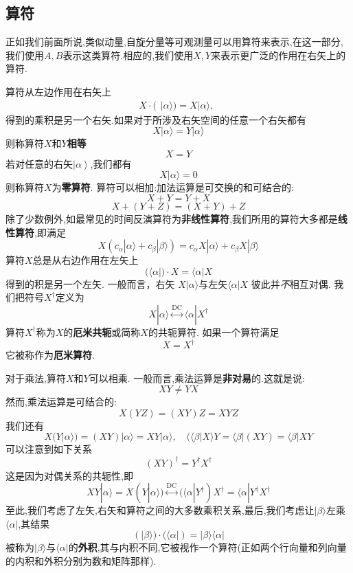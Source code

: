 \documentclass[lang=cn,newtx,10pt,scheme=chinese,thmcnt=section]{elegantbook}
\begin{document}
\subsection*{算符}
正如我们前面所说,类似动量,自旋分量等可观测量可以用算符来表示,在这一部分,我们使用$A,B$表示这类算符.相应的,我们使用$X,Y$来表示更广泛的作用在右矢上的算符.

算符从左边作用在右矢上
$$X\cdot(\begin{array}{c}|\alpha\rangle)=X|\alpha\rangle,\end{array}$$
得到的乘积是另一个右矢.如果对于所涉及右矢空间的任意一个右矢都有
$$X|\alpha\rangle=Y|\alpha\rangle$$
则称算符$X$和$Y$\textbf{相等}
$$X=Y$$
若对任意的右矢$\left|\alpha\right\rangle$,我们都有
$$X|\alpha\rangle=0$$
则称算符$X$为\textbf{零算符}. 算符可以相加:加法运算是可交换的和可结合的:
$$X+Y=Y+X$$
$$X+(Y+Z)=(X+Y)+Z$$
除了少数例外,如最常见的时间反演算符为\textbf{非线性算符},我们所用的算符大多都是\textbf{线性算符},即满足
\begin{equation}
	X(c_\alpha|\alpha\rangle+c_\beta|\beta\rangle)=c_\alpha X|\alpha\rangle+c_\beta X|\beta\rangle 
\end{equation}
算符$X$总是从右边作用在左矢上
\begin{equation}
	(\langle\alpha|)\cdot X=\langle\alpha|X
\end{equation}
得到的积是另一个左矢. 一般而言，右矢 $X|\alpha\rangle$与左矢$\langle\alpha|X$ 彼此并\textit{不}相互对偶. 我们把符号$X^\dagger$定义为
\begin{equation}
	X|\alpha\rangle\overset{\mathrm{DC}}{\operatorname*{\leftrightarrow}}\langle\alpha| X^\dagger
\end{equation}
算符$X^\dagger$称为$X$的\textbf{厄米共轭}或简称$X$的共轭算符. 如果一个算符满足
\begin{equation}
	X=X^\dagger
\end{equation}
它被称作为\textbf{厄米算符}.

对于乘法,算符$X$和$Y$可以相乘. 一般而言,乘法运算是\textbf{非对易}的.这就是说:
\begin{equation}
	XY\ne YX 
\end{equation}
然而,乘法运算是可结合的:
\begin{equation}
	X(YZ)=(XY)Z=XYZ
\end{equation}
我们还有
$$X(Y|\alpha\rangle)=(XY)|\alpha\rangle=XY|\alpha\rangle,\quad(\langle\beta|X\rangle Y=\langle\beta|(XY)=\langle\beta|XY$$
可以注意到如下关系
\begin{equation}
	(XY)^\dagger=Y^\dagger X^\dagger
\end{equation}
这是因为对偶关系的共轭性,即
\begin{equation}
	XY|\alpha\rangle=X(Y|\alpha\rangle)\overset{\mathrm{DC}}{\operatorname*{\leftrightarrow}}(\langle\alpha|Y^\dagger)X^\dagger=\langle\alpha|Y^\dagger X^\dagger 
\end{equation}
至此,我们考虑了左矢,右矢和算符之间的大多数乘积关系,最后,我们考虑让$|\beta\rangle$左乘$\langle\alpha|$,其结果
\begin{equation}
	(|\beta\rangle)\cdot(\langle\alpha|)=|\beta\rangle\langle\alpha|
\end{equation}
被称为$|\beta\rangle$与$\langle\alpha|$的\textbf{外积},其与内积不同,它被视作一个算符(正如两个行向量和列向量的内积和外积分别为数和矩阵那样).
\end{document}
